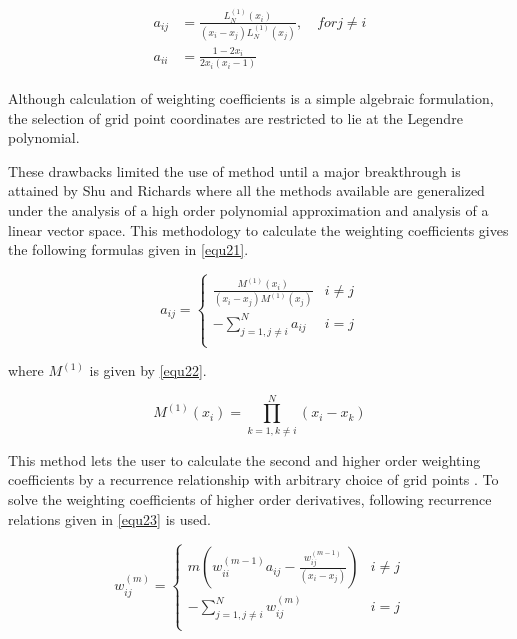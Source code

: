\begin{align}
\begin{split}
a_{ij} &= \frac{L_N^{(1)}(x_i)}{(x_i-x_j)L_N^{(1)}(x_j)}, \quad for j \neq i \\
a_{ii} &= \frac{1-2x_i}{2x_i(x_i -1)}
\end{split}
\end{align}

Although calculation of weighting coefficients is a simple algebraic formulation, the selection of grid point coordinates are restricted to lie at the Legendre polynomial. 

These drawbacks limited the use of method until a major breakthrough is attained by Shu and Richards \cite{ShuDQM} where all the methods available are generalized under the analysis of a high order polynomial approximation and analysis of a linear vector space. This methodology to calculate the weighting coefficients gives the following formulas given in \eqref{equ21}.

\begin{equation} \label{equ21}
a_{ij}=\left\{ \begin{matrix}
   \frac{{{M}^{\left( 1 \right)}}\left( {{x}_{i}} \right)}{\left( {{x}_{i}}-{{x}_{j}} \right){{M}^{\left( 1 \right)}}\left( {{x}_{j}} \right)} & i\ne j  \\
   -\sum\limits_{j=1,j\ne i}^{N}{a_{ij}} & i=j  \\
\end{matrix} \right.
\end{equation}

where  ${{M}^{\left( 1 \right)}}$  is given by \eqref{equ22}.

\begin{equation} \label{equ22}
{{M}^{\left( 1 \right)}}\left( {{x}_{i}} \right)=\prod\limits_{k=1,k\ne i}^{N}{\left( {{x}_{i}}-{{x}_{k}} \right)}
\end{equation}

This method lets the user to calculate the second and higher order weighting coefficients by a recurrence relationship with arbitrary choice of grid points \cite{ShuDifferential}. To solve the weighting coefficients of higher order derivatives, following recurrence relations given in \eqref{equ23} is used.

\begin{equation} \label{equ23}
w_{ij}^{\left( m \right)}=\left\{ \begin{matrix}
   m\left( w_{ii}^{\left( m-1 \right)}a_{ij}-\frac{w_{ij}^{\left( m-1 \right)}}{\left( {{x}_{i}}-{{x}_{j}} \right)} \right) & i\ne j  \\
   -\sum\limits_{j=1,j\ne i}^{N}{w_{ij}^{\left( m \right)}} & i=j  \\
\end{matrix} \right.
\end{equation}


